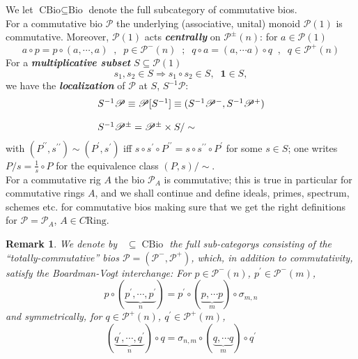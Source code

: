 \documentclass[leqno]{article}
\newcommand{\myemph}[1]{{\it{\bf{#1}}}}
\newcommand{\unit}{{\mathbf{1}}}
\newcommand{\biop}{\mathscr{P}}
\DeclareMathOperator{\cbio}{CBio}
\DeclareMathOperator{\ctbio}{C_TBio}
\newtheorem{remark}[equation]{Remark}
\numberwithin{equation}{section}
\begin{document}
\noindent We let $\text{CBio}\subseteq \text{Bio}$ denote the full subcategory of
commutative bios. \vspace{.1cm}\\
For a commutative bio $\biop$ the underlying (associative, unital) monoid $\biop(1)$ is
commutative. Moreover, $\biop(1)$ acts \myemph{centrally} on $\biop^{\pm}(n)$: for $a\in
\biop(1)$
\begin{equation}
				a\circ p = p \circ(a,\cdots , a)\;\;,\;\; p\in\biop^{-}(n)\;\; ; \;\; q\circ a =
				(a,\cdots a)\circ q\;\; , \;\; q\in \biop^{+}(n)
				\label{eq:4.4}
\end{equation}
For a \myemph{multiplicative subset} $S\subseteq\biop(1)$ 
\begin{equation}
				s_{1},s_{2}\in S \Longrightarrow  s_{1}\circ s_{2}\in S,\;\; \unit\in S, 
				\label{eq:4.5}
\end{equation}
we have the \myemph{localization} of $\biop$ at $S$, $S^{-1}\biop$:
\begin{equation}
				\begin{array}[H]{l}
				S^{-1}\biop \equiv \biop[S^{-1}]\equiv (S^{-1}\biop^{-},S^{-1}\biop^{+}) \\\\
				S^{-1}\biop^{\pm}= \biop^{\pm}\times S /\sim 
				\end{array}
				\label{eq:4.6}
\end{equation}
with $(P^{\prime\prime},s^{\prime\prime})\sim (P^{\prime},s^{\prime})$ iff $s\circ
s^{\prime}\circ P^{\prime\prime} = s\circ
s^{\prime\prime}\circ P^{\prime}$ for some $s\in S$; one writes
$P/s=\frac{1}{s}\circ P$ for the equivalence class $(P,s)/\sim$. \vspace{.2cm}\\
For a commutative rig
$A$ the bio $\biop_{A}$ is commutative; this is true in particular for commutative
rings $A$, and we shall continue and define ideals, primes, spectrum, schemes etc. for
commutative bios making sure that we get the right definitions for
$\biop=\biop_{A}$, $A\in C\text{Ring}$.
\begin{remark}
				We denote by $\ctbio\subseteq \cbio$ the full sub-categorys consisting of the
				``totally-commutative'' bios $\biop=(\biop^{-},\biop^{+})$, which, in addition to
				commutativity, satisfy the Boardman-Vogt interchange: For $p\in\biop^{-}(n)$,
				$p^{\prime}\in\biop^{-}(m)$, 
				\begin{equation*}
								p\circ (\underbrace{p^{\prime},\cdots
								,p^{\prime}}_{n})=p^{\prime}\circ(\underbrace{p,\cdots p}_{m})\circ \sigma_{m,n}
				\end{equation*}
				and symmetrically, for $q\in\biop^{+}(n)$, $q^{\prime}\in\biop^{+}(m)$,
				\begin{equation*}
								 (\underbrace{q^{\prime},\cdots
								,q^{\prime}}_{n})\circ q=\sigma_{n,m}\circ(\underbrace{q,\cdots q}_{m})\circ
								q^{\prime} 
				\end{equation*}
				\label{remark:4.7}
\end{remark}
\end{document}
